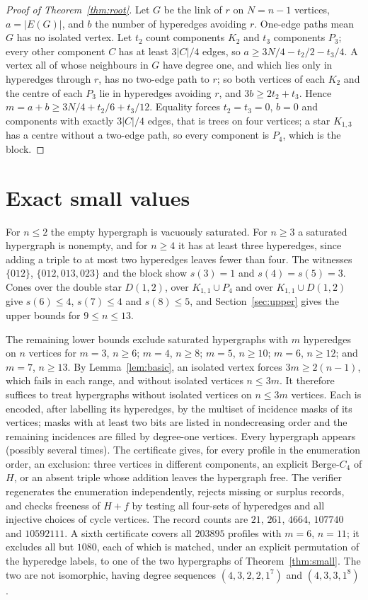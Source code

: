 \documentclass[11pt]{article}
\theoremstyle{remark}
\begin{document}
\begin{proof}[Proof of Theorem~\ref{thm:root}]
Let $G$ be the link of $r$ on $N=n-1$ vertices, $a=|E(G)|$, and $b$ the
number of hyperedges avoiding $r$. One-edge paths mean $G$ has no isolated
vertex. Let $t_2$ count components $K_2$ and $t_3$ components $P_3$; every
other component $C$ has at least $3|C|/4$ edges, so $a\ge3N/4-t_2/2-t_3/4$.
A vertex all of whose neighbours in $G$ have degree one, and which lies
only in hyperedges through $r$, has no two-edge path to $r$; so both
vertices of each $K_2$ and the centre of each $P_3$ lie in hyperedges
avoiding $r$, and $3b\ge2t_2+t_3$. Hence $m=a+b\ge3N/4+t_2/6+t_3/12$.
Equality forces $t_2=t_3=0$, $b=0$ and components with exactly $3|C|/4$
edges, that is trees on four vertices; a star $K_{1,3}$ has a centre
without a two-edge path, so every component is $P_4$, which is the block.
\end{proof}

\section{Exact small values}\label{sec:small}

For $n\le2$ the empty hypergraph is vacuously saturated. For $n\ge3$ a
saturated hypergraph is nonempty, and for $n\ge4$ it has at least three
hyperedges, since adding a triple to at most two hyperedges leaves fewer
than four. The witnesses $\{012\}$, $\{012,013,023\}$ and the block show
$s(3)=1$ and $s(4)=s(5)=3$. Cones over the double star $D(1,2)$, over
$K_{1,1}\cup P_4$ and over $K_{1,1}\cup D(1,2)$ give $s(6)\le4$, $s(7)\le4$
and $s(8)\le5$, and Section~\ref{sec:upper} gives the upper bounds for
$9\le n\le13$.

The remaining lower bounds exclude saturated hypergraphs with $m$
hyperedges on $n$ vertices for $m=3$, $n\ge6$; $m=4$, $n\ge8$; $m=5$,
$n\ge10$; $m=6$, $n\ge12$; and $m=7$, $n\ge13$. By
Lemma~\ref{lem:basic}, an isolated vertex forces $3m\ge2(n-1)$, which fails
in each range, and without isolated vertices $n\le3m$. It therefore
suffices to treat hypergraphs without isolated vertices on $n\le3m$
vertices. Each is encoded, after labelling its hyperedges, by the multiset
of incidence masks of its vertices; masks with at least two bits are
listed in nondecreasing order and the remaining incidences are filled by
degree-one vertices. Every hypergraph appears (possibly several times).
The certificate gives, for every profile in the enumeration order, an
exclusion: three vertices in different components, an explicit Berge-$C_4$
of $H$, or an absent triple whose addition leaves the hypergraph free. The
verifier regenerates the enumeration independently, rejects missing or
surplus records, and checks freeness of $H+f$ by testing all four-sets of
hyperedges and all injective choices of cycle vertices. The record counts
are $21$, $261$, $4664$, $107740$ and $10592111$. A sixth certificate
covers all $203895$ profiles with $m=6$, $n=11$; it excludes all but
$1080$, each of which is matched, under an explicit permutation of the
hyperedge labels, to one of the two hypergraphs of Theorem~\ref{thm:small}.
The two are not isomorphic, having degree sequences
$(4,3,2,2,1^7)$ and $(4,3,3,1^8)$.
\end{document}
